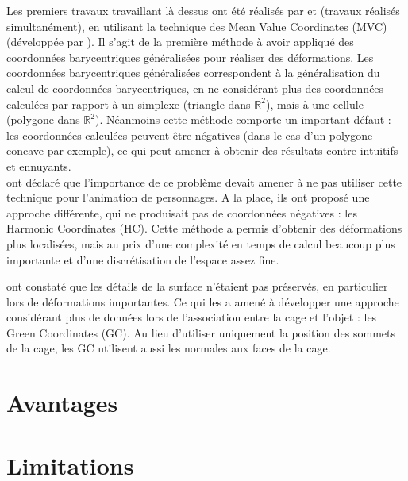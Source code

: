 Les premiers travaux travaillant là dessus ont été réalisés par \cite{JSW05} et
\cite{FKR05} (travaux réalisés simultanément), en utilisant la technique des
Mean Value Coordinates (MVC) (développée par \cite{Flo03}). Il s'agit de la
première méthode à avoir appliqué des coordonnées barycentriques généralisées
pour réaliser des déformations. Les coordonnées barycentriques généralisées
correspondent à la généralisation du calcul de coordonnées barycentriques, en ne
considérant plus des coordonnées calculées par rapport à un simplexe (triangle
dans $\mathbb{R}^2$), mais à une cellule (polygone dans $\mathbb{R}^2$).
Néanmoins cette méthode comporte un important défaut : les coordonnées calculées
peuvent être négatives (dans le cas d'un polygone concave par exemple), ce qui
peut amener à obtenir des résultats contre-intuitifs et ennuyants. \\

\cite{JMDGS07} ont déclaré que l'importance de ce problème devait amener à ne
pas utiliser cette technique pour l'animation de personnages. A la place, ils
ont proposé une approche différente, qui ne produisait pas de coordonnées
négatives : les Harmonic Coordinates (HC). Cette méthode a permis d'obtenir des
déformations plus localisées, mais au prix d'une complexité en temps de calcul
beaucoup plus importante et d'une discrétisation de l'espace assez fine.

\cite{LLC08} ont constaté que les détails de la surface n'étaient pas préservés,
en particulier lors de déformations importantes. Ce qui les a amené à développer
une approche considérant plus de données lors de l'association entre la cage et
l'objet : les Green Coordinates (GC). Au lieu d'utiliser uniquement la position
des sommets de la cage, les GC utilisent aussi les normales aux faces de la
cage.

\section{Avantages}

\section{Limitations}